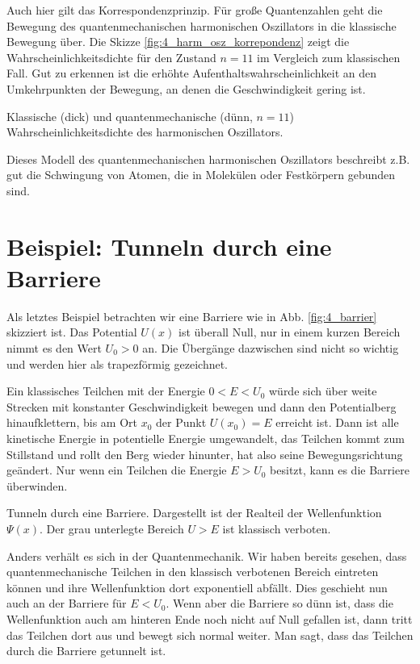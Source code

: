 Auch hier gilt das Korrespondenzprinzip. Für große Quantenzahlen geht die Bewegung des quantenmechanischen harmonischen Oszillators in die klassische Bewegung über. Die Skizze \ref{fig:4_harm_osz_korrepondenz} zeigt die Wahrscheinlichkeitsdichte für den Zustand $n=11$ im Vergleich zum klassischen Fall. Gut zu erkennen ist die erhöhte Aufenthaltswahrscheinlichkeit an den Umkehrpunkten der Bewegung, an denen die Geschwindigkeit gering ist.

\begin{marginfigure}
    \caption{Klassische (dick) und quantenmechanische (dünn, $n=11$) Wahrscheinlichkeitsdichte des harmonischen Oszillators.}
    \label{fig:4_harm_osz_korrepondenz}
\end{marginfigure}

Dieses Modell des quantenmechanischen harmonischen Oszillators beschreibt z.B. gut die Schwingung von Atomen, die in Molekülen oder Festkörpern gebunden sind.

\section{Beispiel: Tunneln durch eine Barriere}

Als letztes Beispiel betrachten wir eine Barriere wie in Abb.  \ref{fig:4_barrier} skizziert ist. Das Potential $U(x)$ ist überall Null, nur in einem kurzen Bereich nimmt es den Wert $U_0 > 0$ an. Die Übergänge dazwischen sind nicht so wichtig und werden hier als trapezförmig gezeichnet.

Ein klassisches Teilchen mit der Energie $0 < E < U_0$ würde sich über weite Strecken mit konstanter Geschwindigkeit bewegen und dann den Potentialberg hinaufklettern, bis am Ort $x_0$ der Punkt $U(x_0) = E$ erreicht ist. Dann ist alle kinetische Energie in potentielle Energie umgewandelt, das Teilchen kommt zum Stillstand und rollt den Berg wieder hinunter, hat also seine Bewegungsrichtung geändert. Nur wenn ein Teilchen die Energie $E > U_0$ besitzt, kann es die Barriere überwinden.

\begin{marginfigure}
    \caption{Tunneln durch eine Barriere. Dargestellt ist der Realteil der Wellenfunktion $\Psi(x)$. Der grau unterlegte Bereich $U > E$ ist klassisch verboten.}
    \label{fig:4_barrier}
\end{marginfigure}


Anders verhält es sich in der Quantenmechanik. Wir haben bereits gesehen, dass quantenmechanische Teilchen in den klassisch verbotenen Bereich eintreten können und ihre Wellenfunktion dort exponentiell abfällt. Dies geschieht nun auch an der Barriere für $E < U_0$. Wenn aber die Barriere so dünn ist, dass die Wellenfunktion auch am hinteren Ende noch nicht auf Null gefallen ist, dann tritt das Teilchen dort aus und bewegt sich normal weiter. Man sagt, dass das Teilchen durch die Barriere getunnelt ist. 

